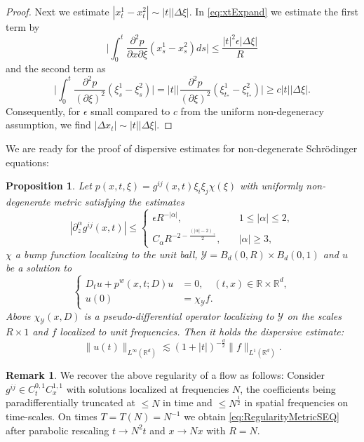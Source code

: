 \documentclass{amsart}
\newtheorem{proposition}[theorem]{Proposition}
\theoremstyle{definition}
\newtheorem{remark}[theorem]{Remark}
\newcommand{\R}{\mathbb{R}}
\begin{document}
\begin{proof}
Next we estimate $|x_t^1 - x_t^2| \sim |t| |\Delta \xi|$. In \eqref{eq:xtExpand} we estimate the first term by
\begin{equation*}
\big| \int_0^t \frac{\partial^2 p}{\partial x \partial \xi} (x_s^1 - x_s^2) ds \big| \leq \frac{|t|^2 \epsilon |\Delta \xi|}{R}
\end{equation*}
and the second term as
\begin{equation*}
\big| \int_0^t \frac{\partial^2 p}{(\partial \xi)^2}(\xi_s^1- \xi_s^2) \big| = |t| \big| \frac{\partial^2 p}{(\partial \xi)^2} (\xi_{t_*}^1 - \xi_{t_*}^2) \big| \geq c |t| |\Delta \xi|.
\end{equation*}
Consequently, for $\epsilon$ small compared to $c$ from the uniform non-degeneracy assumption, we find $|\Delta x_t| \sim |t| |\Delta \xi|$.
\end{proof}



We are ready for the proof of dispersive estimates for non-degenerate Schr\"odinger equations:
\begin{proposition}
\label{prop:DispersiveEstimateSEQ}
Let $p(x,t,\xi) = g^{ij}(x,t) \xi_i \xi_j \chi(\xi)$ with uniformly non-degenerate metric satisfying the estimates
\begin{equation*}
|\partial_z^{\alpha} g^{ij}(x,t)| \leq 
\begin{cases}
\epsilon R^{-|\alpha|}, &\quad 1 \leq |\alpha| \leq 2, \\
C_\alpha R^{-2 - \frac{(|\alpha|-2)_+}{2}}, &\quad |\alpha| \geq 3,
\end{cases}
\end{equation*}
 $\chi$ a bump function localizing to the unit ball, $\mathcal{Y} = B_d(0,R) \times B_d(0,1)$ and $u$ be a solution to
\begin{equation*}
\left\{ \begin{array}{cl}
D_t u + p^w(x,t;D) u &= 0, \quad (t,x) \in \R \times \R^d, \\
u(0) &= \chi_{\mathcal{Y}} f.
\end{array} \right.
\end{equation*}
Above $\chi_{\mathcal{Y}}(x,D)$ is a pseudo-differential operator localizing to $\mathcal{Y}$ on the scales $R \times 1$ and $f$ localized to unit frequencies. Then it holds the dispersive estimate: 
\begin{equation*}
\| u(t) \|_{L^\infty(\R^d)} \lesssim (1+|t|)^{-\frac{d}{2}} \| f \|_{L^1(\R^d)}.
\end{equation*}
\end{proposition}
\begin{remark}
We recover the above regularity of a flow as follows: Consider $g^{ij} \in C^{0,1}_t C^{1,1}_x$ with solutions localized at frequencies $N$, the coefficients being paradifferentially truncated at $\leq N$ in time and $\leq N^{\frac{1}{2}}$ in spatial frequencies on time-scales. On times $T=T(N)=N^{-1}$ we obtain \eqref{eq:RegularityMetricSEQ} after parabolic rescaling $t \to N^2 t$ and $x \to N x$ with $R=N$.
\end{remark}
\end{document}
